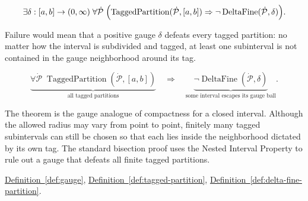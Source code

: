 \begin{remark*}
\[
\exists \delta:[a,b]\to(0,\infty)\;
\forall \dot{\mathcal{P}}\;\Bigl(
\operatorname{TaggedPartition}(\dot{\mathcal{P}},[a,b])
\Rightarrow
\neg\operatorname{DeltaFine}(\dot{\mathcal{P}},\delta)
\Bigr).
\]
\end{remark*}

\begin{remark*}
Failure would mean that a positive gauge $\delta$ defeats every tagged
partition: no matter how the interval is subdivided and tagged, at least
one subinterval is not contained in the gauge neighborhood around its tag.
\end{remark*}

\begin{remark*}
\[
\underbrace{\forall \dot{\mathcal{P}}\;
\operatorname{TaggedPartition}(\dot{\mathcal{P}},[a,b])}_{\text{all tagged partitions}}
\quad\Rightarrow\quad
\underbrace{\neg\operatorname{DeltaFine}(\dot{\mathcal{P}},\delta)}_{\text{some interval escapes its gauge ball}}.
\]
\end{remark*}

\begin{remark*}[Interpretation]
The theorem is the gauge analogue of compactness for a closed interval.
Although the allowed radius may vary from point to point, finitely many
tagged subintervals can still be chosen so that each lies inside the
neighborhood dictated by its own tag. The standard bisection proof uses
the Nested Interval Property to rule out a gauge that defeats all finite
tagged partitions.
\end{remark*}

\begin{remark*}[Dependencies]
\hyperref[def:gauge]{Definition~\ref*{def:gauge}},
\hyperref[def:tagged-partition]{Definition~\ref*{def:tagged-partition}},
\hyperref[def:delta-fine-partition]{Definition~\ref*{def:delta-fine-partition}}.
\end{remark*}


